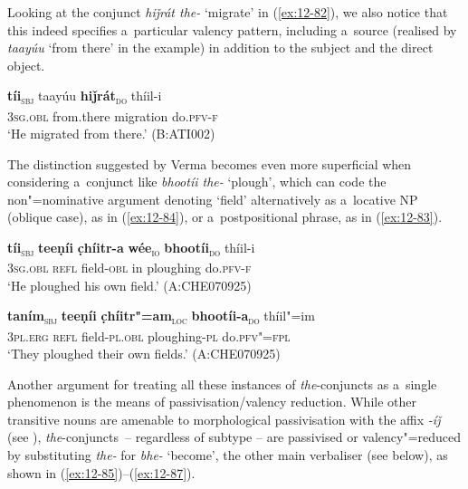 Looking at the conjunct \textit{hiǰrát the-} `migrate' in (\ref{ex:12-82}), we also notice that this indeed specifies a~particular valency pattern, including a~source (realised by \textit{taayúu} `from there' in the example) in addition to the subject and the direct object. 

\begin{exe}
\ex
\label{ex:12-82}
\gll {\ob}\textbf{tíi}{\cb}\textsubscript{\textsc{\upshape sbj}} taayúu {\ob}\textbf{hiǰrát}{\cb}\textsubscript{\textsc{\upshape do}} thíil-i\\
\textsc{3sg.obl} from.there migration do.\textsc{pfv-f}\\
\glt `He migrated from there.' (B:ATI002)
\end{exe}

The distinction suggested by Verma becomes even more superficial when considering a~conjunct like \textit{bhootíi the-} `plough', which can code the non"=nominative argument denoting `field' alternatively as a~locative NP (oblique case), as in (\ref{ex:12-84}), or a~postpositional phrase, as in (\ref{ex:12-83}).

\begin{exe}
\ex
\label{ex:12-83}
\gll {\ob}\textbf{tíi}{\cb}\textsubscript{\textsc{\upshape sbj}} {\ob}\textbf{teeṇíi} \textbf{c̣híitr-a} \textbf{wée}{\cb}\textsubscript{\textsc{\upshape io}} {\ob}\textbf{bhootíi}{\cb}\textsubscript{\textsc{\upshape do}} thíil-i\\
\textsc{3sg.obl} \textsc{refl} field-\textsc{obl} in ploughing do.\textsc{pfv-f}\\
\glt `He ploughed his own field.' (A:CHE070925)
\end{exe}
\begin{exe}
\ex
\label{ex:12-84}
\gll {\ob}\textbf{taním}{\cb}\textsubscript{\textsc{\upshape sbj}} {\ob}\textbf{teeṇíi} \textbf{c̣híitr"=am}{\cb}\textsubscript{\textsc{\upshape loc}} {\ob}\textbf{bhootíi-a}{\cb}\textsubscript{\textsc{\upshape do}} thíil"=im\\
\textsc{3pl.erg} \textsc{refl} field-\textsc{pl.obl} ploughing-\textsc{pl} do.\textsc{pfv"=fpl} \\
\glt `They ploughed their own fields.' (A:CHE070925)
\end{exe}

Another argument for treating all these instances of \textit{the}-conjuncts as a~single phenomenon is the means of passivisation/valency reduction. While other transitive nouns are amenable to morphological passivisation with the affix \textit{-íǰ} (see ), \textit{the}-conjuncts~-- regardless of subtype -- are passivised or valency"=reduced by substituting \textit{the-} for \textit{bhe-} `become', the other main verbaliser (see below), as shown in (\ref{ex:12-85})--(\ref{ex:12-87}).

